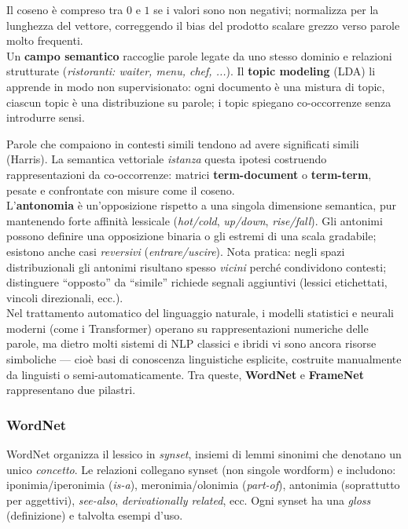         Il coseno è compreso tra $0$ e $1$ se i valori sono non negativi; normalizza per la lunghezza del vettore, correggendo il bias del prodotto scalare grezzo verso parole molto frequenti.\\

        Un \textbf{campo semantico} raccoglie parole legate da uno stesso dominio e relazioni strutturate (\emph{ristoranti: waiter, menu, chef, ...}). Il \textbf{topic modeling} (LDA) li apprende in modo non supervisionato: ogni documento è una mistura di topic, ciascun topic è una distribuzione su parole; i topic spiegano co-occorrenze senza introdurre sensi.
    
        Parole che compaiono in contesti simili tendono ad avere significati simili (Harris). La semantica vettoriale \emph{istanza} questa ipotesi costruendo rappresentazioni da co-occorrenze: matrici \textbf{term-document} o \textbf{term-term}, pesate e confrontate con misure come il coseno.\\

        L'\textbf{antonomia} è un'opposizione rispetto a una singola dimensione semantica, pur mantenendo forte affinità lessicale (\emph{hot/cold}, \emph{up/down}, \emph{rise/fall}). Gli antonimi possono definire una opposizione binaria o gli estremi di una scala gradabile; esistono anche casi \emph{reversivi} (\emph{entrare/uscire}). Nota pratica: negli spazi distribuzionali gli antonimi risultano spesso \emph{vicini} perché condividono contesti; distinguere “opposto” da “simile” richiede segnali aggiuntivi (lessici etichettati, vincoli direzionali, ecc.).\\

        \noindent Nel trattamento automatico del linguaggio naturale, i modelli statistici e neurali moderni (come i Transformer) operano su rappresentazioni numeriche delle parole, ma dietro molti sistemi di NLP classici e ibridi vi sono ancora risorse simboliche — cioè basi di conoscenza linguistiche esplicite, costruite manualmente da linguisti o semi-automaticamente.
        Tra queste, \textbf{WordNet} e \textbf{FrameNet} rappresentano due pilastri.

        \newpage
            
        \subsubsection{WordNet}

            WordNet organizza il lessico in \emph{synset}, insiemi di lemmi sinonimi che denotano un unico \emph{concetto}. Le relazioni collegano synset (non singole wordform) e includono: iponimia/iperonimia (\emph{is\!-a}), meronimia/olonimia (\emph{part\!-of}), antonimia (soprattutto per aggettivi), \emph{see\!-also}, \emph{derivationally related}, ecc. Ogni synset ha una \emph{gloss} (definizione) e talvolta esempi d'uso.

